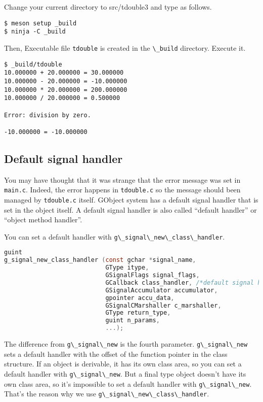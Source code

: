 Change your current directory to src/tdouble3 and type as follows.

\begin{lstlisting}
$ meson setup _build
$ ninja -C _build
\end{lstlisting}

Then, Executable file \passthrough{\lstinline!tdouble!} is created in
the \passthrough{\lstinline!\_build!} directory. Execute it.

\begin{lstlisting}
$ _build/tdouble
10.000000 + 20.000000 = 30.000000
10.000000 - 20.000000 = -10.000000
10.000000 * 20.000000 = 200.000000
10.000000 / 20.000000 = 0.500000

Error: division by zero.

-10.000000 = -10.000000
\end{lstlisting}

\subsection{Default signal handler}\label{default-signal-handler}

You may have thought that it was strange that the error message was set
in \passthrough{\lstinline!main.c!}. Indeed, the error happens in
\passthrough{\lstinline!tdouble.c!} so the message should been managed
by \passthrough{\lstinline!tdouble.c!} itself. GObject system has a
default signal handler that is set in the object itself. A default
signal handler is also called ``default handler'' or ``object method
handler''.

You can set a default handler with
\passthrough{\lstinline!g\_signal\_new\_class\_handler!}.

\begin{lstlisting}[language=C]
guint
g_signal_new_class_handler (const gchar *signal_name,
                            GType itype,
                            GSignalFlags signal_flags,
                            GCallback class_handler, /*default signal handler */
                            GSignalAccumulator accumulator,
                            gpointer accu_data,
                            GSignalCMarshaller c_marshaller,
                            GType return_type,
                            guint n_params,
                            ...);
\end{lstlisting}

The difference from \passthrough{\lstinline!g\_signal\_new!} is the
fourth parameter. \passthrough{\lstinline!g\_signal\_new!} sets a
default handler with the offset of the function pointer in the class
structure. If an object is derivable, it has its own class area, so you
can set a default handler with \passthrough{\lstinline!g\_signal\_new!}.
But a final type object doesn't have its own class area, so it's
impossible to set a default handler with
\passthrough{\lstinline!g\_signal\_new!}. That's the reason why we use
\passthrough{\lstinline!g\_signal\_new\_class\_handler!}.

